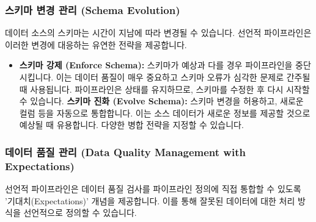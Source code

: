 \documentclass[11pt,a4paper]{article}
\theoremstyle{definition}
\begin{document}
\begin{enumerate}
\subsubsection{스키마 변경 관리 (Schema Evolution)}
데이터 소스의 스키마는 시간이 지남에 따라 변경될 수 있습니다. 선언적 파이프라인은 이러한 변경에 대응하는 유연한 전략을 제공합니다.

\begin{itemize}
    \item \textbf{스키마 강제 (Enforce Schema):} 스키마가 예상과 다를 경우 파이프라인을 중단시킵니다. 이는 데이터 품질이 매우 중요하고 스키마 오류가 심각한 문제로 간주될 때 사용됩니다. 파이프라인은 상태를 유지하므로, 스키마를 수정한 후 다시 시작할 수 있습니다.
    \textbf{스키마 진화 (Evolve Schema):} 스키마 변경을 허용하고, 새로운 컬럼 등을 자동으로 통합합니다. 이는 소스 데이터가 새로운 정보를 제공할 것으로 예상될 때 유용합니다. 다양한 병합 전략을 지정할 수 있습니다.
\end{itemize}

\subsubsection{데이터 품질 관리 (Data Quality Management with Expectations)}
선언적 파이프라인은 데이터 품질 검사를 파이프라인 정의에 직접 통합할 수 있도록 '기대치(Expectations)' 개념을 제공합니다. 이를 통해 잘못된 데이터에 대한 처리 방식을 선언적으로 정의할 수 있습니다.


\end{enumerate}
\end{document}
